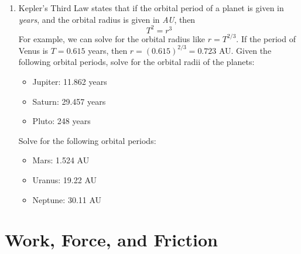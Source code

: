\documentclass[10pt]{article}
\begin{document}
\begin{enumerate}
\item Kepler's Third Law states that if the orbital period of a planet is given in \textit{years}, and the orbital radius is given in \textit{AU}, then 
\begin{equation}
T^2 = r^3
\end{equation}
For example, we can solve for the orbital radius like $r = T^{2/3}$.  If the period of Venus is $T=0.615$ years, then $r = (0.615)^{2/3} = 0.723$ AU.  Given the following orbital periods, solve for the orbital radii of the planets:
\begin{itemize}
\item Jupiter: 11.862 years
\item Saturn: 29.457 years
\item Pluto: 248 years
\end{itemize}
Solve for the following orbital periods:
\begin{itemize}
\item Mars: 1.524 AU
\item Uranus: 19.22 AU
\item Neptune: 30.11 AU
\end{itemize}
\end{enumerate}

\section{Work, Force, and Friction}
\end{document}
